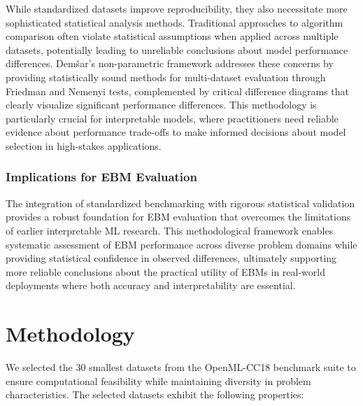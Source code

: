 \documentclass[12pt]{article}
\begin{document}
While standardized datasets improve reproducibility, they also necessitate more sophisticated statistical analysis methods. Traditional approaches to algorithm comparison often violate statistical assumptions when applied across multiple datasets, potentially leading to unreliable conclusions about model performance differences. Dem\v{s}ar's non-parametric framework \cite{demsar2006} addresses these concerns by providing statistically sound methods for multi-dataset evaluation through Friedman and Nemenyi tests, complemented by critical difference diagrams that clearly visualize significant performance differences. This methodology is particularly crucial for interpretable models, where practitioners need reliable evidence about performance trade-offs to make informed decisions about model selection in high-stakes applications.

\subsubsection{Implications for EBM Evaluation}

The integration of standardized benchmarking with rigorous statistical validation provides a robust foundation for EBM evaluation that overcomes the limitations of earlier interpretable ML research. This methodological framework enables systematic assessment of EBM performance across diverse problem domains while providing statistical confidence in observed differences, ultimately supporting more reliable conclusions about the practical utility of EBMs in real-world deployments where both accuracy and interpretability are essential.

\section{Methodology}


We selected the 30 smallest datasets from the OpenML-CC18 benchmark suite to ensure computational feasibility while maintaining diversity in problem characteristics. The selected datasets exhibit the following properties:
\end{document}
